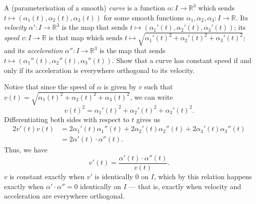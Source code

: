 \documentclass[12 pt, letterpaper]{hmcpset}
\begin{document}
\pagebreak

\begin{problem}[Problem 5.]
	A (parameterisation of a smooth) \textit{curve} is a function $\alpha : I \to \mathbb{R}^3$ which sends $t \mapsto (\alpha_1(t), \alpha_2(t), \alpha_3(t))$ for some smooth functions $\alpha_1, \alpha_2, \alpha_3 : I \to \mathbb{R}$. Its \textit{velocity} $\alpha' : I \to \mathbb{R}^3$ is the map that sends $t \mapsto (\alpha_1'(t), \alpha_2'(t), \alpha_3'(t))$; its \textit{speed} $v : I \to \mathbb{R}$ is that map which sends $t \mapsto \sqrt{\alpha_1'(t)^2 + \alpha_2'(t)^2 + \alpha_3'(t)^2}$; and its \textit{acceleration} $\alpha'' : I \to \mathbb{R}^3$ is the map that sends $t \mapsto (\alpha_1''(t), \alpha_2''(t), \alpha_3''(t))$. Show that a curve has constant speed if and only if its acceleration is everywhere orthogonal to its velocity.
\end{problem}

\begin{solution}
	Notice that since the speed of $\alpha$ is given by $v$ such that $v(t) = \sqrt{\alpha_1(t)^2 + \alpha_2(t)^2 + \alpha_3(t)^2}$, we can write
	\[
		v(t)^2 = \alpha_1'(t)^2 + \alpha_2'(t)^2 + \alpha_3'(t)^2.
	\]
	Differentiating both sides with respect to $t$ gives us
	\[
		\begin{split}
			2 v'(t) v(t) & = 2 \alpha_1'(t) \alpha_1''(t) + 2 \alpha_2'(t) \alpha_2''(t) + 2 \alpha_3'(t) \alpha_3''(t) \\
				& = 2 \alpha'(t) \cdot \alpha''(t).
		\end{split}
	\]
	Thus, we have
	\[
		v'(t) = \frac{\alpha'(t) \cdot \alpha''(t)}{v(t)}.
	\]
	$v$ is constant exactly when $v'$ is identically $0$ on $I$, which by this relation happens exactly when $\alpha' \cdot \alpha'' = 0$ identically on $I$ --- that is, exactly when velocity and acceleration are everywhere orthogonal.
\end{solution}
\end{document}

